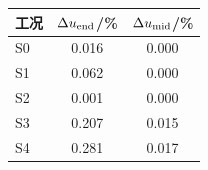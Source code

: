 \begin{tabular}{@{}lS[table-format=1.3]S[table-format=1.3]@{}}
\toprule
工况 & {$\Delta u_{\rm end}$/\%} & {$\Delta u_{\rm mid}$/\%} \\
\midrule
S0 & 0.016 & 0.000 \\
S1 & 0.062 & 0.000 \\
S2 & 0.001 & 0.000 \\
S3 & 0.207 & 0.015 \\
S4 & 0.281 & 0.017 \\
\bottomrule
\end{tabular}

